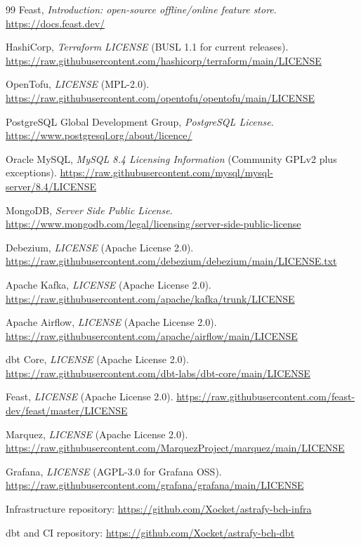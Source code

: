 \documentclass[10pt,a4paper]{article}
\begin{document}
\begin{thebibliography}{99}
Feast, \emph{Introduction: open-source offline/online feature store}.
\url{https://docs.feast.dev/}

HashiCorp, \emph{Terraform LICENSE} (BUSL 1.1 for current releases).
\url{https://raw.githubusercontent.com/hashicorp/terraform/main/LICENSE}

OpenTofu, \emph{LICENSE} (MPL-2.0).
\url{https://raw.githubusercontent.com/opentofu/opentofu/main/LICENSE}

PostgreSQL Global Development Group, \emph{PostgreSQL License}.
\url{https://www.postgresql.org/about/licence/}

Oracle MySQL, \emph{MySQL 8.4 Licensing Information} (Community GPLv2 plus exceptions).
\url{https://raw.githubusercontent.com/mysql/mysql-server/8.4/LICENSE}

MongoDB, \emph{Server Side Public License}.
\url{https://www.mongodb.com/legal/licensing/server-side-public-license}

Debezium, \emph{LICENSE} (Apache License 2.0).
\url{https://raw.githubusercontent.com/debezium/debezium/main/LICENSE.txt}

Apache Kafka, \emph{LICENSE} (Apache License 2.0).
\url{https://raw.githubusercontent.com/apache/kafka/trunk/LICENSE}

Apache Airflow, \emph{LICENSE} (Apache License 2.0).
\url{https://raw.githubusercontent.com/apache/airflow/main/LICENSE}

dbt Core, \emph{LICENSE} (Apache License 2.0).
\url{https://raw.githubusercontent.com/dbt-labs/dbt-core/main/LICENSE}

Feast, \emph{LICENSE} (Apache License 2.0).
\url{https://raw.githubusercontent.com/feast-dev/feast/master/LICENSE}

Marquez, \emph{LICENSE} (Apache License 2.0).
\url{https://raw.githubusercontent.com/MarquezProject/marquez/main/LICENSE}

Grafana, \emph{LICENSE} (AGPL-3.0 for Grafana OSS).
\url{https://raw.githubusercontent.com/grafana/grafana/main/LICENSE}

Infrastructure repository: \url{https://github.com/Xocket/astrafy-bch-infra}

dbt and CI repository: \url{https://github.com/Xocket/astrafy-bch-dbt}

\end{thebibliography}
\normalsize
\end{document}
